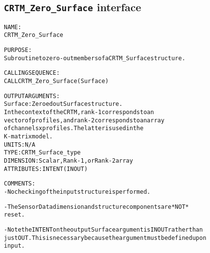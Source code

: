 \subsection{\texttt{CRTM\_Zero\_Surface} interface}
  \label{sec:CRTM_Zero_Surface_interface}
  \begin{alltt}
 
  NAME:
        CRTM_Zero_Surface
  
  PURPOSE:
        Subroutine to zero-out members of a CRTM_Surface structure.
 
  CALLING SEQUENCE:
        CALL CRTM_Zero_Surface( Surface )
 
  OUTPUT ARGUMENTS:
        Surface:      Zeroed out Surface structure.
                      In the context of the CRTM, rank-1 corresponds to an
                      vector of profiles, and rank-2 corresponds to an array
                      of channels x profiles. The latter is used in the
                      K-matrix model.
                      UNITS:      N/A
                      TYPE:       CRTM_Surface_type
                      DIMENSION:  Scalar, Rank-1, or Rank-2 array
                      ATTRIBUTES: INTENT(IN OUT)
 
  COMMENTS:
        - No checking of the input structure is performed.
 
        - The SensorData dimension and structure components are *NOT*
          reset.
 
        - Note the INTENT on the output Surface argument is IN OUT rather than
          just OUT. This is necessary because the argument must be defined upon
          input.
 
  \end{alltt}

